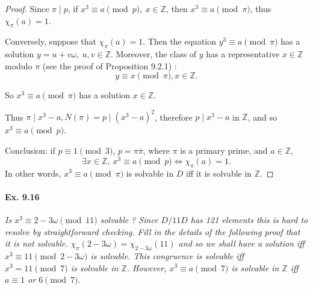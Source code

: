 \documentclass[11pt,a4paper]{article}
\newcommand{\Z}{\mathbb{Z}}
\begin{document}
\begin{proof}
Since $\pi \mid p$, if $ x^3 \equiv a \pmod p,\ x \in \Z$, then $ x^3 \equiv a \pmod \pi$, thus $\chi_{\pi}(a) = 1$.

Conversely, suppose that $\chi_{\pi}(a) = 1$. Then the equation $y^3 \equiv a \pmod \pi$ has a solution $y = u + v \omega, \ u,v \in \Z$. Moreover, the class of $y$ has a representative $x \in \Z$ modulo $\pi$ (see the proof of Proposition 9.2.1) :
$$y\equiv  x \pmod \pi, x \in \Z.$$

So $x^3 \equiv a \pmod \pi$ has a solution $x \in \Z$.

Thus $\pi \mid x^3 - a, N(\pi) = p \mid (x^3 -a)^2$, therefore $p \mid x^3 -a$ in $\Z$, and so $x^3 \equiv a \pmod p$.

Conclusion: if $p\equiv 1 \pmod 3$, $p = \pi \overline{\pi}$, where $\pi$ is a primary prime,  and $a \in \Z$,
$$\exists x \in \Z, \ x^3 \equiv a \pmod p \iff \chi_{\pi}(a) = 1.$$
In other words, $x^3 \equiv a \pmod \pi$ is solvable in $D$ iff it is solvable in $\Z$.
\end{proof}

\paragraph{Ex. 9.16}

{\it Is $x^3 \equiv 2 - 3\omega \pmod {11}$ solvable ? Since $D/11D$ has 121 elements this is hard to resolve by straightforward checking. Fill in the details of the following proof that it is not solvable. $\chi_{\pi}(2 - 3 \omega) = \chi_{2-3\omega}(11)$ and so we shall have a solution iff $x^3 \equiv 11 \pmod {2-3\omega}$ is solvable. This congruence is solvable iff $x^3 = 11\pmod 7$ is solvable in $\Z$. However, $x^3 \equiv a \pmod 7$ is solvable in $\Z$ iff $a \equiv 1$ or $6 \pmod 7$.
}
\end{document}
